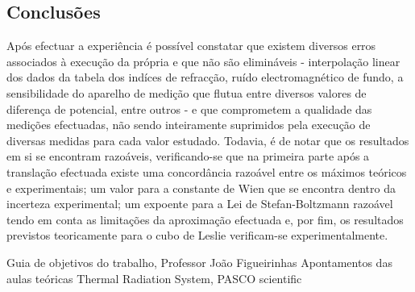 \documentclass[9pt]{extarticle}
\begin{document}
\begin{multicols}{2}
\section{Conclusões}

\par Após efectuar a experiência é possível constatar que existem diversos erros associados à execução da própria e que não são elimináveis - interpolação linear dos dados da tabela dos indíces de refracção, ruído electromagnético de fundo, a sensibilidade do aparelho de medição que flutua entre diversos valores de diferença de potencial, entre outros - e que comprometem a qualidade das medições efectuadas, não sendo inteiramente suprimidos pela execução de diversas medidas para cada valor estudado. Todavia, é de notar que os resultados em si se encontram razoáveis, verificando-se que na primeira parte após a translação efectuada existe uma concordância razoável entre os máximos teóricos e experimentais; um valor para a constante de Wien que se encontra dentro da incerteza experimental; um expoente para a Lei de Stefan-Boltzmann razoável tendo em conta as limitações da aproximação efectuada e, por fim, os resultados previstos teoricamente para o cubo de Leslie verificam-se experimentalmente.

\begin{thebibliography}{9}

 Guia de objetivos do trabalho, Professor João Figueirinhas
 Apontamentos das aulas teóricas
 Thermal Radiation System, PASCO scientific

\end{thebibliography}

\vfill

\pagebreak

%

\end{multicols}
\end{document}
